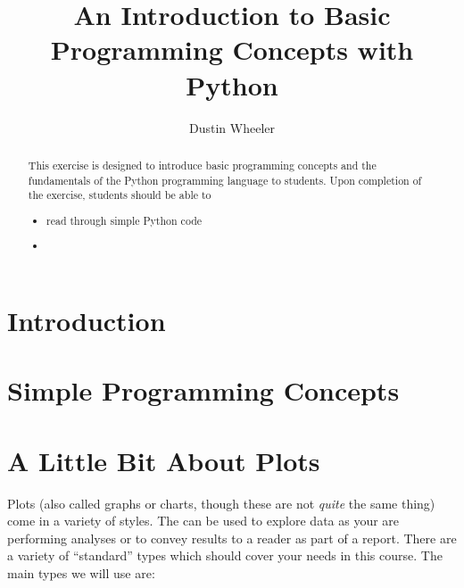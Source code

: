 \documentclass[nobib,nofonts,nols,nohyper]{tufte-handout}
\title{An Introduction to Basic Programming Concepts with Python}
\author{Dustin Wheeler}
\begin{document}
\maketitle

\begin{abstract}
	\noindent
  This exercise is designed to introduce basic programming concepts and the
  fundamentals of the Python programming language to students.
  Upon completion of the exercise, students should be able to
  \begin{itemize}
    \item read through simple Python code
    \item
  \end{itemize}
\end{abstract}

\section{Introduction} %
\label{sec:intro}



\section{Simple Programming Concepts} %
\label{sec:simple_programming_concepts}


\section{A Little Bit About Plots} %
\label{sec:a-little-bit-about-plots}

Plots (also called graphs or charts, though these are not \emph{quite} the same thing) come in a variety of styles. 
The can be used to explore data as your are performing analyses or to convey results to a reader as part of a report. 
There are a variety of ``standard'' types which should cover your needs in this course. 
The main types we will use are:
\end{document}
